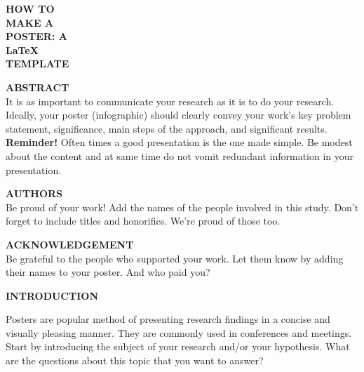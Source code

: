 \documentclass[12pt]{article}
\begin{document}
\pagecolor{paynes.grey!25} %
\thispagestyle{empty} %
\color{deep.charcoal} %
\setlength{\columnsep}{0.35cm} %

\begin{paracol}{2}

	\Huge{\bf HOW TO\\
	MAKE A\\ POSTER: A\\
	\LaTeX\\TEMPLATE }\\
	\bigskip

	\footnotesize
	\textbf{ABSTRACT}\\
	It is as important to communicate your research as it is to do your research.
	Ideally, your poster (infographic) should clearly convey your work's key problem statement,
	significance, main steps of the approach, and significant results.\\
	
	\textbf{Reminder! }Often times a good presentation is the one made simple. Be modest about
	the content and at same time do not vomit redundant information in your presentation.\\
	\bigskip
	
	\textbf{AUTHORS}\\
	Be proud of your work! Add the names of the people involved in this study. Don't
	forget to include titles and honorifics. We're proud of those too.\\
	\smallskip

	\textbf{ACKNOWLEDGEMENT}\\
	Be grateful to the people who supported your work. Let them know by adding their
	names to your poster. And who paid you?

	\switchcolumn
	\begin{multicols}{3}
		{\large\textbf{INTRODUCTION}}\\
		\vspace{-0.3cm}

		Posters are popular method of presenting research findings in a concise and visually
		pleasing manner. They are commonly used in conferences and meetings. Start by introducing
		the subject of your research and/or your hypothesis. What are the questions about this
		topic that you want to answer?


\end{multicols}
\end{paracol}
\end{document}
